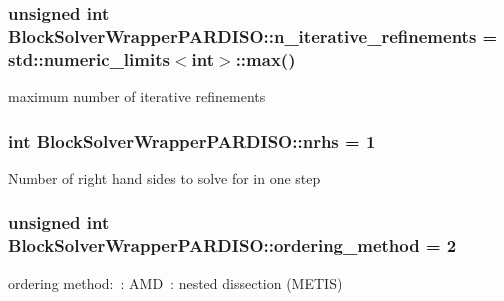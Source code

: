 \subsubsection[{\texorpdfstring{n\+\_\+iterative\+\_\+refinements}{n_iterative_refinements}}]{\setlength{\rightskip}{0pt plus 5cm}unsigned int Block\+Solver\+Wrapper\+P\+A\+R\+D\+I\+S\+O\+::n\+\_\+iterative\+\_\+refinements = std\+::numeric\+\_\+limits$<$int$>$\+::{\bf max}()}\hypertarget{class_block_solver_wrapper_p_a_r_d_i_s_o_afdb2039acda86d2def4e0eee33635dab}{}\label{class_block_solver_wrapper_p_a_r_d_i_s_o_afdb2039acda86d2def4e0eee33635dab}
maximum number of iterative refinements 
\subsubsection[{\texorpdfstring{nrhs}{nrhs}}]{\setlength{\rightskip}{0pt plus 5cm}int Block\+Solver\+Wrapper\+P\+A\+R\+D\+I\+S\+O\+::nrhs = 1\hspace{0.3cm}{\ttfamily [private]}}\hypertarget{class_block_solver_wrapper_p_a_r_d_i_s_o_a84ae552a3b77bb009366379148119ef8}{}\label{class_block_solver_wrapper_p_a_r_d_i_s_o_a84ae552a3b77bb009366379148119ef8}
Number of right hand sides to solve for in one step 
\subsubsection[{\texorpdfstring{ordering\+\_\+method}{ordering_method}}]{\setlength{\rightskip}{0pt plus 5cm}unsigned int Block\+Solver\+Wrapper\+P\+A\+R\+D\+I\+S\+O\+::ordering\+\_\+method = 2}\hypertarget{class_block_solver_wrapper_p_a_r_d_i_s_o_a3bf4e0ea8332a4e6c71eac84f385663c}{}\label{class_block_solver_wrapper_p_a_r_d_i_s_o_a3bf4e0ea8332a4e6c71eac84f385663c}
ordering method\+:~\+: A\+MD~\+: nested dissection (M\+E\+T\+IS) 

